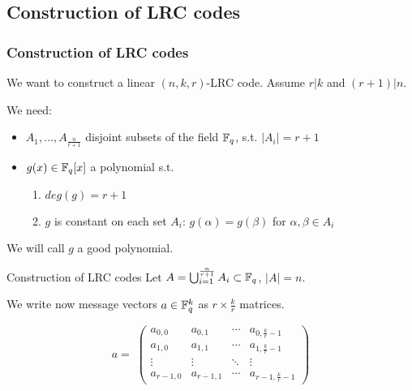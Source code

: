 \subsection{Construction of LRC codes}

\begin{frame}
        \frametitle{Construction of LRC codes}
        We want to construct a linear $(n,k,r)$-LRC code. Assume $r \vert k$ and $(r+1) \vert n$.
        
        We need:
        
        \begin{itemize}
            \item $A_1 , \dots , A_{\frac{n}{r+1}}$ disjoint subsets of the field $\mathbb{F}_q$, s.t. $\vert A_i \vert = r+1$
            \item $g(x) \in \mathbb{F}_q[x]$ a polynomial s.t.
            \begin{enumerate}
                \item $deg(g) = r+1$
                \item $g$ is constant on each set $A_i$: $g(\alpha) = g(\beta)$ for $\alpha, \beta \in A_i$
            \end{enumerate}
        \end{itemize}                
        We will call $g$ a good polynomial.
        
    \end{frame}
    
    \begin{frame}{Construction of LRC codes}
        Let $A= \bigcup_{i=1}^{\frac{n}{r+1}} A_i \subset \mathbb{F}_q$, $\vert A \vert = n$.
        
        We write now message vectors $a \in \mathbb{F}_q^k$ as $r \times \frac{k}{r}$ matrices.
        
        $$ a = \;
        \begin{pmatrix}
            a_{0,0} & a_{0,1} & \cdots & a_{0,\frac{k}{r}-1} \\
            a_{1,0} & a_{1,1} & \cdots & a_{1,\frac{k}{r}-1} \\
            \vdots  & \vdots  & \ddots & \vdots \\
            a_{r-1,0} & a_{r-1,1} & \cdots & a_{r-1,\frac{k}{r}-1}
        \end{pmatrix}
        $$
    \end{frame}
    
